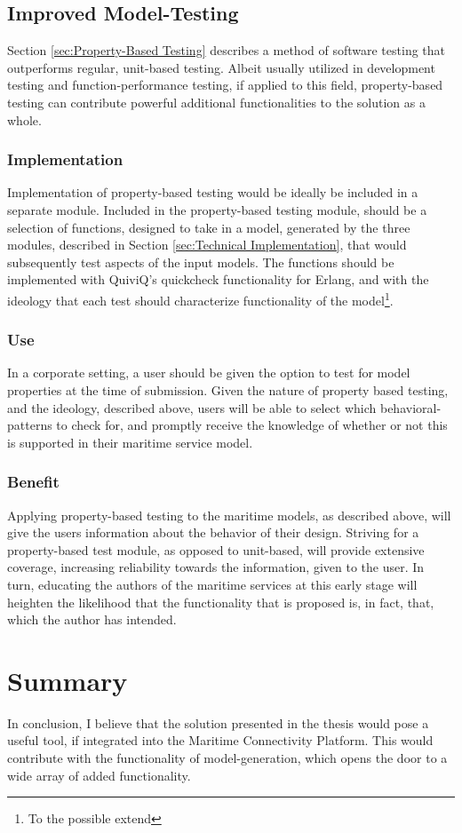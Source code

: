 \subsection{Improved Model-Testing}
Section \ref{sec:Property-Based Testing} describes a method of software testing that outperforms regular, unit-based testing. Albeit usually utilized in development testing and function-performance testing, if applied to this field, property-based testing can contribute powerful additional functionalities to the solution as a whole. 
\subsubsection{Implementation}
Implementation of property-based testing would be ideally be included in a separate module. Included in the property-based testing module, should be a selection of functions, designed to take in a model, generated by the three modules, described in Section \ref{sec:Technical Implementation}, that would subsequently test aspects of the input models. The functions should be implemented with QuiviQ's quickcheck functionality for Erlang, and with the ideology that each test should characterize  functionality of the model\footnote[1]{To the possible extend}.
\subsubsection{Use}
In a corporate setting, a user should be given the option to test for model properties at the time of submission. Given the nature of property based testing, and the ideology, described above, users will be able to select which behavioral-patterns to check for, and promptly receive the knowledge of whether or not this is supported in their maritime service model.
\subsubsection{Benefit}
Applying property-based testing to the maritime models, as described above, will give the users information about the behavior of their design. Striving for a property-based test module, as opposed to unit-based, will provide extensive coverage, increasing reliability towards the information, given to the user. In turn, educating the authors of the maritime services at this early stage will heighten the likelihood that the functionality that is proposed is, in fact, that, which the author has intended.
\section{Summary}
In conclusion, I believe that the solution presented in the thesis would pose a useful tool, if integrated into the Maritime Connectivity Platform. This would contribute with the functionality of model-generation, which opens the door to a wide array of added functionality. 

